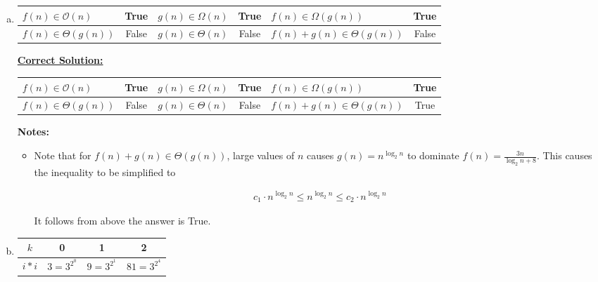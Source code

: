 \documentclass[12pt]{article}
\begin{document}
\begin{enumerate}[a.]
    \item

    \begin{tabular}{|l|c|l|c|l|c|}
        \hline
        $f(n) \in \mathcal{O}(n)$ & True & $g(n) \in \Omega(n)$ & True & $f(n) \in \Omega(g(n))$ & True\\
        \hline
        $f(n) \in \Theta(g(n))$ & False & $g(n) \in \Theta(n)$ & False & $f(n) + g(n) \in \Theta(g(n))$ & False\\
        \hline
    \end{tabular}

    \begin{mdframed}
        \underline{\textbf{Correct Solution:}}

        \bigskip

        \begin{tabular}{|l|c|l|c|l|c|}
            \hline
            $f(n) \in \mathcal{O}(n)$ & True & $g(n) \in \Omega(n)$ & True & $f(n) \in \Omega(g(n))$ & True\\
            \hline
            $f(n) \in \Theta(g(n))$ & False & $g(n) \in \Theta(n)$ & False & $f(n) + g(n) \in \Theta(g(n))$ & \color{red}True\color{black}\\
            \hline
        \end{tabular}

    \end{mdframed}

    \bigskip

    \textbf{Notes:}

    \begin{itemize}
        \item Note that for $f(n) + g(n) \in \Theta(g(n))$, large values of $n$
        causes $g(n) = n^{\log_2 n}$ to dominate $f(n) = \frac{3n}{\log_2 n + 8}$.
        This causes the inequality to be simplified to

        \setcounter{equation}{0}
        \begin{align}
            c_1 \cdot n^{\log_2 n} \leq n^{\log_2 n} \leq c_2 \cdot n^{\log_2 n}
        \end{align}

        \bigskip

        It follows from above the answer is True.
    \end{itemize}

    \item


    \begin{tabular}{|c|c|c|c|}
        \hline
        $k$ & 0 & 1 & 2 \\
        \hline
        $i * i$ & $3 = 3^{2^0}$ & $9 = 3^{2^1}$ & $81 = 3^{2^4}$\\
        \hline
    \end{tabular}


\end{enumerate}
\end{document}
